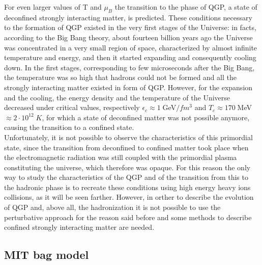 For even larger values of T and $\mu_{B}$ the transition to the phase of QGP, a state of deconfined strongly interacting matter, is predicted. These conditions necessary to the formation of QGP existed in the very first stages of the Universe: in facts, according to the Big Bang theory, about fourteen billion years ago the Universe was concentrated in a very small region of space, characterized by almost infinite temperature and energy, and then it started expanding and consequently cooling down. In the first stages, corresponding to few microseconds after the Big Bang, the temperature was so high that hadrons could not be formed and all the strongly interacting matter existed in form of QGP. However, for the expansion and the cooling, the energy density and the temperature of the Universe decreased under critical values, respectively $\epsilon_{c}\approx1 \;$GeV$/fm^{3}$ and $T_{c}\approx 170\; $MeV $ \approx 2\cdot10^{12}\; K$, for which a state of deconfined matter was not possible anymore, causing the transition to a confined state.\\ Unfortunately, it is not possible to observe the characteristics of this primordial state, since the transition from deconfined to confined matter took place when the electromagnetic radiation was still coupled with the primordial plasma constituting the universe, which therefore was opaque. For this reason the only way to study the characteristics of the QGP and of the transition from this to the hadronic phase is to recreate these conditions using high energy heavy ions collisions, as it will be seen farther.
However, in orther to describe the evolution of QGP and, above all, the hadronization it is not possible to use the perturbative approach for the reason said before and some methods to describe confined strongly interacting matter are needed.

\subsection{MIT bag model}

